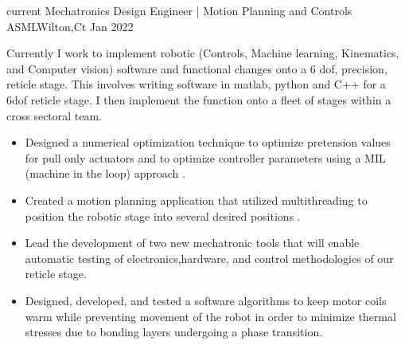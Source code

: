 \begin{experiences}

\experience
  {current}      {Mechatronics Design Engineer |  Motion Planning and Controls }{ASML}{Wilton,Ct}
  {Jan 2022} {
                  Currently I work to implement robotic (Controls, Machine learning, Kinematics, and Computer vision) software and functional changes onto a 6 dof, precision, reticle stage. This involves writing software in matlab, python and C++ for a 6dof reticle stage. I then implement the function onto a fleet of stages within a cross sectoral team. 
			\begin{itemize}
		\item Designed a numerical optimization technique to optimize pretension  values for pull only actuators and to optimize controller parameters using a MIL (machine in the loop) approach .
                       \item Created a motion planning application that utilized multithreading to position the robotic stage into several desired positions  .
		    \item Lead the development of two new mechatronic tools that will enable automatic testing of electronics,hardware, and control methodologies of our reticle stage.
		 \item Designed, developed, and tested a software algorithms to keep motor coils warm while preventing movement of the robot in order to minimize thermal stresses due to bonding layers undergoing a phase transition.
		

\end{itemize}}
\end{experiences}
